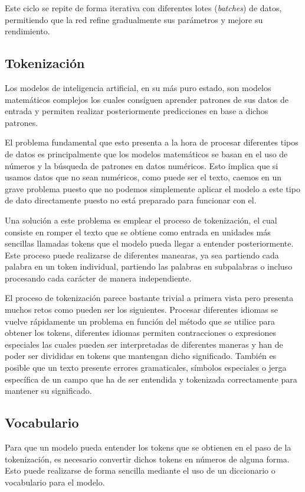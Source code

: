 Este ciclo se repite de forma iterativa con diferentes lotes (\textit{batches}) de datos, permitiendo que la red refine gradualmente sus parámetros y mejore su rendimiento.

\subsection{Tokenización}

Los modelos de inteligencia artificial, en su más puro estado, son modelos matemáticos complejos los cuales consiguen aprender patrones de sus datos de entrada y permiten realizar posteriormente predicciones en base a dichos patrones.

El problema fundamental que esto presenta a la hora de procesar diferentes tipos de datos es principalmente que los modelos matemáticos se basan en el uso de números y la búsqueda de patrones en datos numéricos. Esto implica que si usamos datos que no sean numéricos, como puede ser el texto, caemos en un grave problema puesto que no podemos simplemente aplicar el modelo a este tipo de dato directamente puesto no está preparado para funcionar con el.

Una solución a este problema es emplear el proceso de tokenización, el cual consiste en romper el texto que se obtiene como entrada en unidades más sencillas llamadas tokens que el modelo pueda llegar a entender posteriormente. Este proceso puede realizarse de diferentes manearas, ya sea partiendo cada palabra en un token individual, partiendo las palabras en subpalabras o incluso procesando cada carácter de manera independiente.

El proceso de tokenización parece bastante trivial a primera vista pero presenta muchos retos como pueden ser los siguientes. Procesar diferentes idiomas se vuelve rápidamente un problema en función del método que se utilice para obtener los tokens, diferentes idiomas permiten contracciones o expresiones especiales las cuales pueden ser interpretadas de diferentes maneras y han de poder ser divididas en tokens que mantengan dicho significado. También es posible que un texto presente errores gramaticales, símbolos especiales o jerga específica de un campo que ha de ser entendida y tokenizada correctamente para mantener su significado.

\subsection{Vocabulario}

Para que un modelo pueda entender los tokens que se obtienen en el paso de la tokenización, es necesario convertir dichos tokens en números de alguna forma. Esto puede realizarse de forma sencilla mediante el uso de un diccionario o vocabulario para el modelo.

